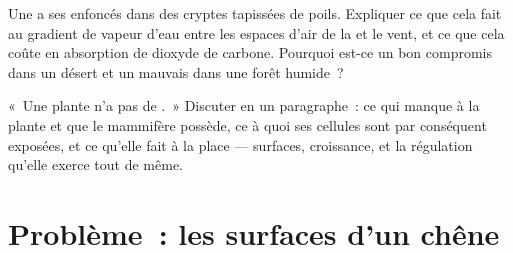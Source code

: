 \begin{exercise}[$\star\star\star$]\label{exo:b1:flowering-plant-organization:11}
Une  a ses  enfoncés dans des cryptes tapissées de
poils. Expliquer ce que cela fait au gradient de vapeur d'eau entre les
espaces d'air de la  et le vent, et ce que cela coûte en
absorption de dioxyde de carbone. Pourquoi est-ce un bon compromis dans
un désert et un mauvais dans une forêt humide~?
\end{exercise}

\begin{exercise}[$\star\star\star$]\label{exo:b1:flowering-plant-organization:12}
«~Une plante n'a pas de .~» Discuter en un paragraphe~:
ce qui manque à la plante et que le mammifère possède, ce à quoi ses
cellules sont par conséquent exposées, et ce qu'elle fait à la place ---
surfaces, croissance, et la régulation qu'elle exerce tout de même.
\end{exercise}

\section{Problème~: les surfaces d'un chêne}

